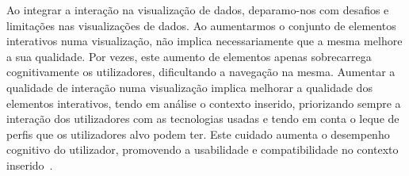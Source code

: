 Ao integrar a interação na visualização de dados, deparamo-nos com desafios e limitações nas visualizações de dados. Ao aumentarmos o conjunto de elementos interativos numa visualização, não implica necessariamente que a mesma melhore a sua qualidade. Por vezes, este aumento de elementos apenas sobrecarrega cognitivamente os utilizadores, dificultando a navegação na mesma. Aumentar a qualidade de interação numa visualização implica melhorar a qualidade dos elementos interativos, tendo em análise o contexto inserido, priorizando sempre a interação dos utilizadores com as tecnologias usadas e tendo em conta o leque de perfis que os utilizadores alvo podem ter. Este cuidado aumenta o desempenho cognitivo do utilizador, promovendo a usabilidade e compatibilidade no contexto inserido~\cite{dimara2019interaction}. 




